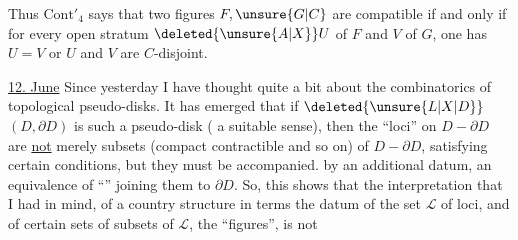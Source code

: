 
Thus $\mathrm{Cont}'_4$ says that two figures $F,\unsure{G|C}$ are compatible if and only if for every open stratum $\deleted{\unsure{A|X}}U$ of $F$ and $V$ of $G$,  one has $U=V$ or $U$ and $V$ are $C$-disjoint.

\uline{12. June} Since yesterday I have thought quite a bit about the combinatorics of topological pseudo-disks. It has emerged that if $\deleted{\unsure{L|X|D}}$ $(D,\partial D)$ is such a pseudo-disk ( a suitable sense), then the ``loci'' on $D-\partial D$ are \uline{not} merely subsets (compact contractible and so on) of $D-\partial D$, satisfying certain conditions, but they must be accompanied. by an additional datum, an equivalence  of ``'' joining them to $\partial D$. So, this shows that the interpretation  that I had in mind, of a country structure in terms  the datum of the set $\mathcal L$ of loci, and of certain sets of subsets of $\mathcal L$, the ``figures'', is not
